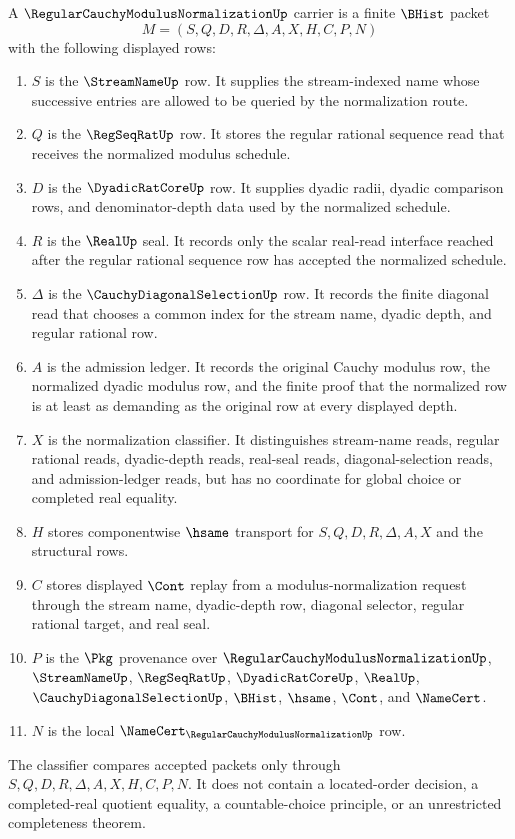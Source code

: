 \begin{definition}
\label{def:regular-cauchy-modulus-normalization-carrier}
A $\RegularCauchyModulusNormalizationUp$ carrier is a finite $\BHist$ packet
$$
M=(S,Q,D,R,\Delta,A,X,H,C,P,N)
$$
with the following displayed rows:
\begin{enumerate}
\item $S$ is the $\StreamNameUp$ row. It supplies the stream-indexed name whose successive entries are allowed to be queried by the normalization route.
\item $Q$ is the $\RegSeqRatUp$ row. It stores the regular rational sequence read that receives the normalized modulus schedule.
\item $D$ is the $\DyadicRatCoreUp$ row. It supplies dyadic radii, dyadic comparison rows, and denominator-depth data used by the normalized schedule.
\item $R$ is the $\RealUp$ seal. It records only the scalar real-read interface reached after the regular rational sequence row has accepted the normalized schedule.
\item $\Delta$ is the $\CauchyDiagonalSelectionUp$ row. It records the finite diagonal read that chooses a common index for the stream name, dyadic depth, and regular rational row.
\item $A$ is the admission ledger. It records the original Cauchy modulus row, the normalized dyadic modulus row, and the finite proof that the normalized row is at least as demanding as the original row at every displayed depth.
\item $X$ is the normalization classifier. It distinguishes stream-name reads, regular rational reads, dyadic-depth reads, real-seal reads, diagonal-selection reads, and admission-ledger reads, but has no coordinate for global choice or completed real equality.
\item $H$ stores componentwise $\hsame$ transport for $S,Q,D,R,\Delta,A,X$ and the structural rows.
\item $C$ stores displayed $\Cont$ replay from a modulus-normalization request through the stream name, dyadic-depth row, diagonal selector, regular rational target, and real seal.
\item $P$ is the $\Pkg$ provenance over $\RegularCauchyModulusNormalizationUp$, $\StreamNameUp$, $\RegSeqRatUp$, $\DyadicRatCoreUp$, $\RealUp$, $\CauchyDiagonalSelectionUp$, $\BHist$, $\hsame$, $\Cont$, and $\NameCert$.
\item $N$ is the local $\NameCert_{\RegularCauchyModulusNormalizationUp}$ row.
\end{enumerate}
The classifier compares accepted packets only through $S,Q,D,R,\Delta,A,X,H,C,P,N$. It does not contain a located-order decision, a completed-real quotient equality, a countable-choice principle, or an unrestricted completeness theorem.
\end{definition}

